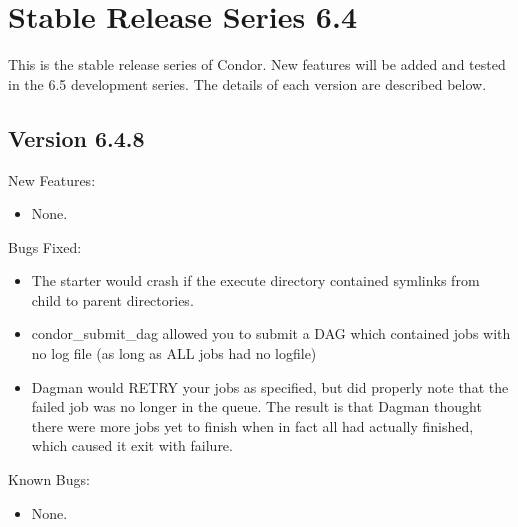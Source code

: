 \section{\label{sec:History-6-4}Stable Release Series 6.4}

This is the stable release series of Condor.
New features will be added and tested in the 6.5 development series. 
The details of each version are described below.

\subsection{\label{sec:New-6-2-0}Version 6.4.8}

\noindent New Features:

\begin{itemize}

\item None.

\end{itemize}

\noindent Bugs Fixed:

\begin{itemize}

\item The starter would crash if the execute directory contained
symlinks from child to parent directories.

\item condor_submit_dag allowed you to submit a DAG which contained
jobs with no log file (as long as ALL jobs had no logfile)

\item Dagman would RETRY your jobs as specified, but did properly
note that the failed job was no longer in the queue.  The result is
that Dagman thought there were more jobs yet to finish when in fact
all had actually finished, which caused it exit with failure.

\end{itemize}

\noindent Known Bugs:

\begin{itemize}

\item None.

\end{itemize}


